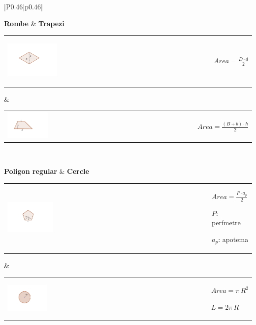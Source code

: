 \begin{center}
\begin{tabular}{|P{0.46\textwidth}|p{0.46\textwidth}|}
		
			 \textbf{Rombe} &   \textbf{Trapezi} \\ \hline
		\begin{tabular}{m{}m{}}
			\begin{center} \includegraphics[width=0.25\textwidth]{img-09/rombe} \end{center} &  \begin{center} 	$Area = \frac{D\cdot d}{2}$   \end{center}
		\end{tabular}
		& 
		\begin{tabular}{m{} m{}}
			\centering \includegraphics[width=0.22\textwidth]{img-09/trapezi} &   \begin{center} $Area = \frac{(B+b)\cdot h}{2}$ \end{center}
		\end{tabular}
		\\ \hline
		
			 \textbf{Poligon regular} &   \textbf{Cercle} \\ \hline
		\begin{tabular}{m{}m{}}
			\begin{center} \includegraphics[width=0.23\textwidth]{img-09/poligon} \end{center} &  \begin{center} 	$Area = \frac{P\cdot a_p}{2}$ \par $P$: perímetre \par $a_p$: apotema   \end{center}
		\end{tabular}
		& 
		\begin{tabular}{m{} m{}}
			\centering \includegraphics[width=0.2\textwidth]{img-09/cercle} &   \begin{center} $Area = \pi\, R^2$ \par $L=2\pi \, R$ \end{center}
		\end{tabular}
		\\ \hline
		

\end{tabular}
\end{center}
